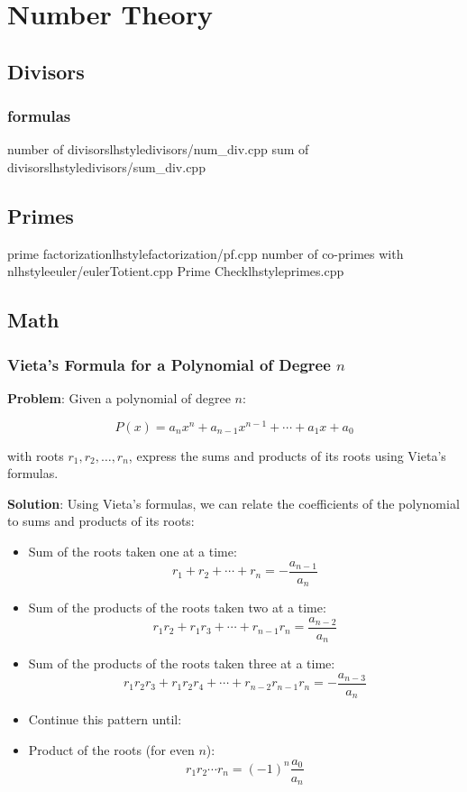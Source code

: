 \section{Number Theory}
    \subsection{Divisors}
       \subsubsection{formulas}
            {number of divisors}{lhstyle}{divisors/num_div.cpp}
            {sum of divisors}{lhstyle}{divisors/sum_div.cpp}
    \subsection{Primes}
         {prime factorization}{lhstyle}{factorization/pf.cpp}
         {number of co-primes with n}{lhstyle}{euler/eulerTotient.cpp}
         {Prime Check}{lhstyle}{primes.cpp}


    \subsection{Math}
        \subsubsection{Vieta's Formula for a Polynomial of Degree \( n \)}

        \textbf{Problem}: Given a polynomial of degree \( n \):

        \[
        P(x) = a_n x^n + a_{n-1} x^{n-1} + \cdots + a_1 x + a_0
        \]

        with roots \( r_1, r_2, \ldots, r_n \), express the sums and products of its roots using Vieta's formulas.

        \textbf{Solution}:
        Using Vieta's formulas, we can relate the coefficients of the polynomial to sums and products of its roots:

        \begin{itemize}
            \item Sum of the roots taken one at a time:
            \[
            r_1 + r_2 + \cdots + r_n = -\frac{a_{n-1}}{a_n}
            \]
            \item Sum of the products of the roots taken two at a time:
            \[
            r_1r_2 + r_1r_3 + \cdots + r_{n-1}r_n = \frac{a_{n-2}}{a_n}
            \]
            \item Sum of the products of the roots taken three at a time:
            \[
            r_1r_2r_3 + r_1r_2r_4 + \cdots + r_{n-2}r_{n-1}r_n = -\frac{a_{n-3}}{a_n}
            \]
            \item Continue this pattern until:
            \item Product of the roots (for even \( n \)):
            \[
            r_1 r_2 \cdots r_n = (-1)^n \frac{a_0}{a_n}
            \]
        \end{itemize}

